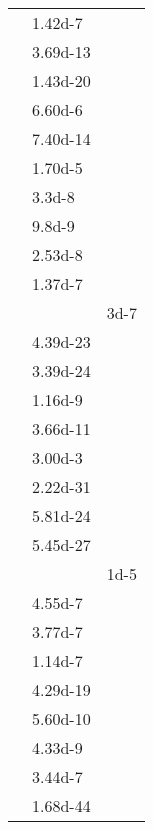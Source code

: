 \documentclass[a4paper, 10pt]{article}
\begin{document}
\begin{footnotesize}
\begin{supertabular}{lll}
          &   \num{1.42d-7} &              \\
       &  \num{3.69d-13} &              \\
        &  \num{1.43d-20} &              \\
          &   \num{6.60d-6} &              \\
          &  \num{7.40d-14} &              \\
          &   \num{1.70d-5} &              \\
           &    \num{3.3d-8} &              \\
           &    \num{9.8d-9} &              \\
          &   \num{2.53d-8} &              \\
         &   \num{1.37d-7} &              \\
            &                 &   \num{3d-7} \\
       &  \num{4.39d-23} &              \\
        &  \num{3.39d-24} &              \\
       &   \num{1.16d-9} &              \\
          &  \num{3.66d-11} &              \\
         &   \num{3.00d-3} &              \\
        &  \num{2.22d-31} &              \\
           &  \num{5.81d-24} &              \\
        &  \num{5.45d-27} &              \\
            &                 &   \num{1d-5} \\
  &   \num{4.55d-7} &              \\
   &   \num{3.77d-7} &              \\
       &   \num{1.14d-7} &              \\
     &  \num{4.29d-19} &              \\
          &  \num{5.60d-10} &              \\
           &   \num{4.33d-9} &              \\
          &   \num{3.44d-7} &              \\
        &  \num{1.68d-44} &              \\

\end{supertabular}
\end{footnotesize}
\end{document}
